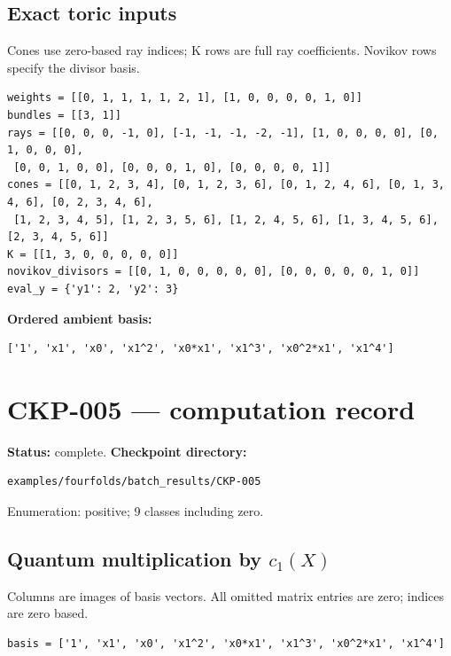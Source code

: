 \documentclass[10pt,a4paper]{article}
\begin{document}
\subsection*{Exact toric inputs}
Cones use zero-based ray indices; K rows are full ray coefficients. Novikov rows specify the divisor basis.

\begin{lstlisting}
weights = [[0, 1, 1, 1, 1, 2, 1], [1, 0, 0, 0, 0, 1, 0]]
bundles = [[3, 1]]
rays = [[0, 0, 0, -1, 0], [-1, -1, -1, -2, -1], [1, 0, 0, 0, 0], [0, 1, 0, 0, 0],
 [0, 0, 1, 0, 0], [0, 0, 0, 1, 0], [0, 0, 0, 0, 1]]
cones = [[0, 1, 2, 3, 4], [0, 1, 2, 3, 6], [0, 1, 2, 4, 6], [0, 1, 3, 4, 6], [0, 2, 3, 4, 6],
 [1, 2, 3, 4, 5], [1, 2, 3, 5, 6], [1, 2, 4, 5, 6], [1, 3, 4, 5, 6], [2, 3, 4, 5, 6]]
K = [[1, 3, 0, 0, 0, 0, 0]]
novikov_divisors = [[0, 1, 0, 0, 0, 0, 0], [0, 0, 0, 0, 0, 1, 0]]
eval_y = {'y1': 2, 'y2': 3}
\end{lstlisting}

\textbf{Ordered ambient basis:}
\begin{lstlisting}
['1', 'x1', 'x0', 'x1^2', 'x0*x1', 'x1^3', 'x0^2*x1', 'x1^4']
\end{lstlisting}

\clearpage\section*{CKP-005 --- computation record}
\textbf{Status:} complete.
\textbf{Checkpoint directory:}
\begin{lstlisting}
examples/fourfolds/batch_results/CKP-005
\end{lstlisting}

Enumeration: positive; 9 classes including zero.
\subsection*{Quantum multiplication by $c_1(X)$}
Columns are images of basis vectors. All omitted matrix entries are zero; indices are zero based.

\begin{lstlisting}
basis = ['1', 'x1', 'x0', 'x1^2', 'x0*x1', 'x1^3', 'x0^2*x1', 'x1^4']
\end{lstlisting}
\end{document}
